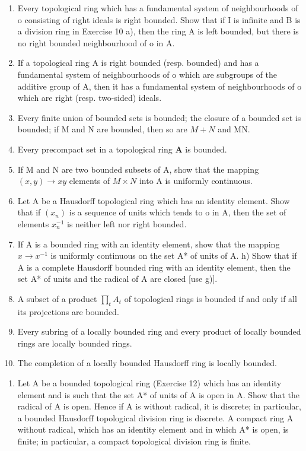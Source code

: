 \begin{enumerate}
\def\labelenumi{\alph{enumi})}
\item
  Every topological ring which has a fundamental system of neighbourhoods of o consisting of right ideals is right bounded. Show that if I is infinite and B is a division ring in Exercise 10 a), then the ring A is left bounded, but there is no right bounded neighbourhood of o in A.
\item
  If a topological ring A is right bounded (resp. bounded) and has a fundamental system of neighbourhoods of o which are subgroups of the additive group of A, then it has a fundamental system of neighbourhoods of o which are right (resp. two-sided) ideals.
\item
  Every finite union of bounded sets is bounded; the closure of a bounded set is bounded; if M and N are bounded, then so are \(M + N\) and MN.
\item
  Every precompact set in a topological ring \(\mathbf{A}\) is bounded.
\item
  If M and N are two bounded subsets of A, show that the mapping \((x, y) \to xy\) elements of \(M \times N\) into A is uniformly continuous.
\item
  Let A be a Hausdorff topological ring which has an identity element. Show that if \((x_{n})\) is a sequence of units which tends to o in A, then the set of elements \(x_{n}^{-1}\) is neither left nor right bounded.
\item
  If A is a bounded ring with an identity element, show that the mapping \(x \rightarrow x^{-1}\) is uniformly continuous on the set A* of units of A. h) Show that if A is a complete Hausdorff bounded ring with an identity element, then the set A* of units and the radical of A are closed {[}use g){]}.
\item
  A subset of a product \(\prod_{t} A_{t}\) of topological rings is bounded if and only if all its projections are bounded.
\item
  Every subring of a locally bounded ring and every product of locally bounded rings are locally bounded rings.
\item
  The completion of a locally bounded Hausdorff ring is locally bounded.
\end{enumerate}

\begin{enumerate}
\def\labelenumi{\arabic{enumi})}
\setcounter{enumi}{12}
\tightlist
\item
  Let A be a bounded topological ring (Exercise 12) which has an identity element and is such that the set A* of units of A is open in A. Show that the radical of A is open. Hence if A is without radical, it is discrete; in particular, a bounded Hausdorff topological division ring is discrete. A compact ring A without radical, which has an identity element and in which A* is open, is finite; in particular, a compact topological division ring is finite.
\end{enumerate}

